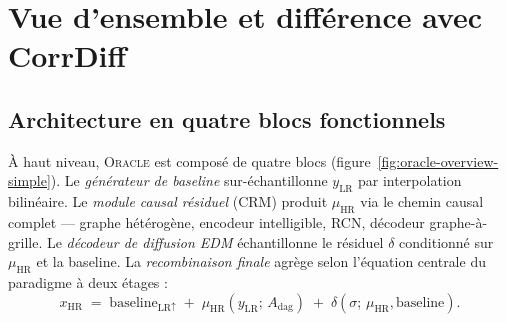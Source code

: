 \documentclass[14pt,a4paper,openany]{extreport}
\theoremstyle{definition}
\newcommand{\Oracle}{\textsc{Oracle}}
\newcommand{\LR}{\ensuremath{\text{LR}}}
\newcommand{\HR}{\ensuremath{\text{HR}}}
\newcommand{\xHR}{\ensuremath{x_{\HR}}}
\newcommand{\yLR}{\ensuremath{y_{\LR}}}
\newcommand{\muHR}{\ensuremath{\mu_{\HR}}}
\newcommand{\Adag}{\ensuremath{A_{\mathrm{dag}}}}
\begin{document}
\section{Vue d'ensemble et différence avec CorrDiff}
\label{sec:oracle-overview}

\subsection{Architecture en quatre blocs fonctionnels}
\label{ssec:oracle-blocs}

À haut niveau, \Oracle{} est composé de quatre blocs (figure~\ref{fig:oracle-overview-simple}). Le \emph{générateur de baseline} sur-échantillonne $\yLR$ par interpolation bilinéaire. Le \emph{module causal résiduel} (CRM) produit $\muHR$ via le chemin causal complet — graphe hétérogène, encodeur intelligible, RCN, décodeur graphe-à-grille. Le \emph{décodeur de diffusion EDM} échantillonne le résiduel $\delta$ conditionné sur $\muHR$ et la baseline. La \emph{recombinaison finale} agrège selon l'équation centrale du paradigme à deux étages :
\begin{equation}
  \xHR \;=\; \mathrm{baseline}_{\LR \uparrow} \;+\; \muHR\!\left(\yLR;\, \Adag\right) \;+\; \delta\!\left(\sigma;\, \muHR, \mathrm{baseline}\right).
  \label{eq:oracle-decomposition}
\end{equation}
\end{document}
